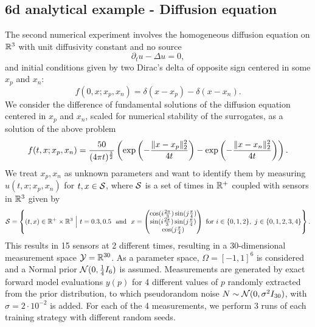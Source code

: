 \subsection{6d analytical example - Diffusion equation}\label{sec:6dexp}

The second numerical experiment involves the homogeneous diffusion equation on $\mathbb{R}^3$ with unit diffusivity constant and no source
\[
\partial_t u - \Delta u =0,
\]
and initial conditions given by two Dirac's delta of opposite sign centered in some $x_p$ and $x_n$:
\[
f (0,x; x_p, x_n) = \delta(x-x_p) - \delta(x-x_n).
\]
We consider the difference of fundamental solutions of the diffusion equation centered in $x_p$ and $x_n$, scaled for numerical stability of the surrogates, as a solution of the above problem
\begin{equation}\label{eq:diffusion-solution}
f(t,x; x_p, x_n) = \frac{50}{(4 \pi t)^{\frac{3}{2}}} \left( \exp \left( - \frac{\lVert x-x_p\rVert_2^2}{4t}\right)- \exp \left( - \frac{\lVert x-x_n\rVert_2^2}{4t}\right) \right).
\end{equation}
We treat $x_p, x_n$ as unknown parameters and want to identify them by measuring $u(t,x;x_p, x_n)$ for $t,x \in \mathcal S$, where $\mathcal S$ is a set of times in $\mathbb{R}^+$ coupled with sensors in $\mathbb{R}^3$ given by
\[
\mc S  = \left\{ (t,x) \in \R^+ \times \R^3 \ \Big| \ t = 0.3, 0.5 \ \text{ and } \ x = \begin{pmatrix}
            \cos( i \frac{2\pi}{3}) \sin( j \frac{\pi}{4}) \\
            \sin( i \frac{2\pi}{3}) \sin( j \frac{\pi}{4}) \\ 
            \cos( j \frac{\pi}{4})
        \end{pmatrix} 
         \text{ for } i \in \{0,1,2\}, \ j \in \{0,1,2,3,4\}
        \right\}.         
\]
This results in 15 sensors at 2 different times, resulting in a 30-dimensional measurement space $\mathcal Y = \mathbb{R}^{30}$. \newline
As a parameter space, $\Omega = [-1,1]^6$ is considered and a Normal prior $\mathcal N (0, \frac{1}{4}I_6)$ is assumed.
Measurements are generated by exact forward model evaluations $y(p)$ for 4 different values of $p$ randomly extracted from the prior distribution, to which pseudorandom noise $N \sim \mathcal N (0, \sigma^2 I_{30})$, with $\sigma = 2 \cdot 10^{-2}$ is added.
For each of the 4 measurements, we perform 3 runs of each training strategy with different random seeds. \medskip

